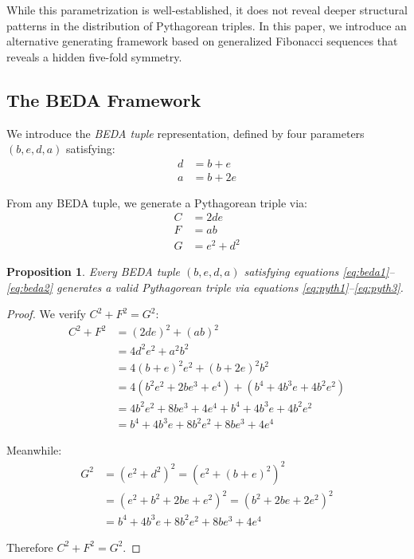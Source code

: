 \documentclass[12pt]{article}
\newtheorem{proposition}[theorem]{Proposition}
\begin{document}
While this parametrization is well-established, it does not reveal deeper structural patterns in the distribution of Pythagorean triples. In this paper, we introduce an alternative generating framework based on generalized Fibonacci sequences that reveals a hidden five-fold symmetry.

\subsection{The BEDA Framework}

We introduce the \emph{BEDA tuple} representation, defined by four parameters $(b, e, d, a)$ satisfying:
\begin{align}
d &= b + e \label{eq:beda1}\\
a &= b + 2e \label{eq:beda2}
\end{align}

From any BEDA tuple, we generate a Pythagorean triple via:
\begin{align}
C &= 2de \label{eq:pyth1}\\
F &= ab \label{eq:pyth2}\\
G &= e^2 + d^2 \label{eq:pyth3}
\end{align}

\begin{proposition}
Every BEDA tuple $(b, e, d, a)$ satisfying equations \eqref{eq:beda1}--\eqref{eq:beda2} generates a valid Pythagorean triple via equations \eqref{eq:pyth1}--\eqref{eq:pyth3}.
\end{proposition}

\begin{proof}
We verify $C^2 + F^2 = G^2$:
\begin{align*}
C^2 + F^2 &= (2de)^2 + (ab)^2 \\
&= 4d^2e^2 + a^2b^2 \\
&= 4(b+e)^2e^2 + (b+2e)^2b^2 \\
&= 4(b^2e^2 + 2be^3 + e^4) + (b^4 + 4b^3e + 4b^2e^2) \\
&= 4b^2e^2 + 8be^3 + 4e^4 + b^4 + 4b^3e + 4b^2e^2 \\
&= b^4 + 4b^3e + 8b^2e^2 + 8be^3 + 4e^4
\end{align*}

Meanwhile:
\begin{align*}
G^2 &= (e^2 + d^2)^2 = (e^2 + (b+e)^2)^2 \\
&= (e^2 + b^2 + 2be + e^2)^2 = (b^2 + 2be + 2e^2)^2 \\
&= b^4 + 4b^3e + 8b^2e^2 + 8be^3 + 4e^4
\end{align*}

Therefore $C^2 + F^2 = G^2$.
\end{proof}
\end{document}

